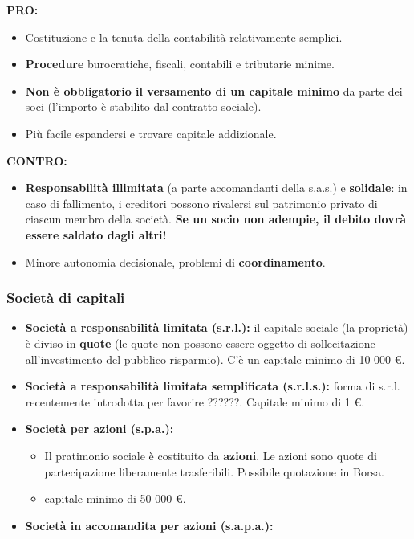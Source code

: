 \documentclass[../main.tex]{subfiles}
\begin{document}
\textbf{PRO:}
\begin{itemize}
\item Costituzione e la tenuta della contabilità relativamente semplici.

\item \textbf{Procedure} burocratiche, fiscali, contabili e tributarie minime.

\item \textbf{Non è obbligatorio il versamento di un capitale minimo} da parte dei soci (l'importo è stabilito dal contratto sociale).

\item Più facile espandersi e trovare capitale addizionale.

\end{itemize}

\textbf{CONTRO:}
\begin{itemize}
\item \textbf{Responsabilità illimitata} (a parte accomandanti della s.a.s.) e \textbf{solidale}: in caso di fallimento, i creditori possono rivalersi sul patrimonio privato di ciascun membro della società. \textbf{Se un socio non adempie, il debito dovrà essere saldato dagli altri!}
\item Minore autonomia decisionale, problemi di \textbf{coordinamento}.

\end{itemize}

\subsubsection{Società di capitali}

\begin{itemize}
\item \textbf{Società a responsabilità limitata (s.r.l.):} il capitale sociale (la proprietà) è diviso in \textbf{quote} (le quote non possono essere oggetto di sollecitazione all'investimento del pubblico risparmio). C'è un capitale minimo di 10 000 €.

\item \textbf{Società a responsabilità limitata semplificata (s.r.l.s.):} forma di s.r.l. recentemente introdotta per favorire ??????. Capitale minimo di 1 €.

\item \textbf{Società per azioni (s.p.a.):}

\begin{itemize}
\item
Il pratimonio sociale è costituito da \textbf{azioni}. Le azioni sono quote di partecipazione liberamente trasferibili. Possibile quotazione in Borsa.
\item capitale minimo di 50 000 €.
\end{itemize}

\item \textbf{Società in accomandita per azioni (s.a.p.a.):}

\end{itemize}
\end{document}
